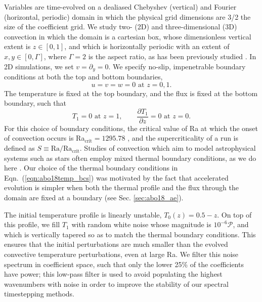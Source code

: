 Variables are time-evolved on a dealiased Chebyshev (vertical) and Fourier (horizontal, periodic) domain in which the physical grid dimensions are 3/2 the size of the coefficient grid.  
We study two- (2D) and three-dimensional (3D) convection in which the domain is a cartesian box, whose dimensionless vertical extent is $z \in [0, 1]$, and which is horizontally periodic with an extent of $x, y \in [0, \Gamma]$, where $\Gamma = 2$ is the aspect ratio, as has been previously studied \citep{goluskin&all2014, johnston&doering2009}. 
In 2D simulations, we set $v = \partial_y = 0$.
We specify no-slip, impenetrable boundary conditions at both the top and bottom boundaries,
\begin{equation}
u = v = w = 0 \, \, \text{at}\,\,z = 0,1.
\label{eqn:abo18vel_bcs}
\end{equation}
The temperature is fixed at the top boundary, and the flux is fixed at the bottom boundary, such that
\begin{equation}
T_1 = 0 \,\,\text{at}\,\, z=1, \qquad
\frac{\partial T_1}{\partial z} = 0\,\,\text{at}\,\,z=0.
\label{eqn:abo18temp_bcs}
\end{equation}
For this choice of boundary conditions, the critical value of Ra at which the onset of convection occurs is Ra$_{\text{crit}} = 1295.78$ \citep{goluskin2016}, and the supercriticality of a run is defined as $S \equiv \text{Ra}/\text{Ra}_{\text{crit}}$.
Studies of convection which aim to model astrophysical systems such as stars often employ mixed thermal boundary conditions, as we do here \citep{hurlburt&all1984, cattaneo&all1991, korre&all2017}.
Our choice of the thermal boundary conditions in Eqn.~(\ref{eqn:abo18temp_bcs}) was motivated by the fact that accelerated evolution is simpler when both the thermal profile and the flux through the domain are fixed at a boundary (see Sec. \ref{sec:abo18_ae}).

The initial temperature profile is linearly unstable, $T_0(z) = 0.5 - z$. On top of this profile, we fill $T_1$ with random white noise whose magnitude is $10^{-6}\mathcal{P}$, and which is vertically tapered so as to match the thermal boundary conditions.
This ensures that the initial perturbations are much smaller than the evolved convective temperature perturbations, even at large Ra.
We filter this noise spectrum in coefficient space, such that only the lower 25\% of the coefficients have power; this low-pass filter is used to avoid populating the highest wavenumbers with noise in order to improve the stability of our spectral timestepping methods.


